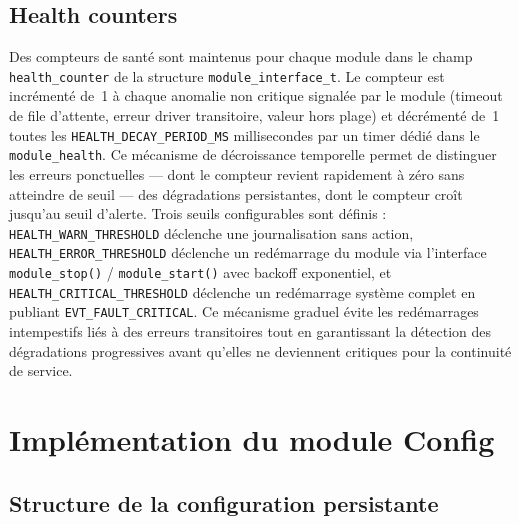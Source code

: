 \subsection{Health counters}
\label{subsec:health_impl}

Des compteurs de santé sont maintenus pour chaque module dans le
champ \texttt{health\_counter} de la structure
\texttt{module\_interface\_t}. Le compteur est incrémenté de~1 à
chaque anomalie non critique signalée par le module (timeout de file
d'attente, erreur driver transitoire, valeur hors plage) et décrémenté
de~1 toutes les \texttt{HEALTH\_DECAY\_PERIOD\_MS} millisecondes par
un timer dédié dans le \texttt{module\_health}. Ce mécanisme de
décroissance temporelle permet de distinguer les erreurs ponctuelles
--- dont le compteur revient rapidement à zéro sans atteindre de seuil
--- des dégradations persistantes, dont le compteur croît jusqu'au
seuil d'alerte. Trois seuils configurables sont définis :
\texttt{HEALTH\_WARN\_THRESHOLD} déclenche une journalisation sans
action, \texttt{HEALTH\_ERROR\_THRESHOLD} déclenche un redémarrage
du module via l'interface \texttt{module\_stop()} / \texttt{module\_start()}
avec backoff exponentiel, et \texttt{HEALTH\_CRITICAL\_THRESHOLD}
déclenche un redémarrage système complet en publiant
\texttt{EVT\_FAULT\_CRITICAL}. Ce mécanisme graduel évite les
redémarrages intempestifs liés à des erreurs transitoires tout en
garantissant la détection des dégradations progressives avant qu'elles
ne deviennent critiques pour la continuité de service.

\section{Implémentation du module Config}
\label{sec:config_impl}

\subsection{Structure de la configuration persistante}
\label{subsec:config_struct}

